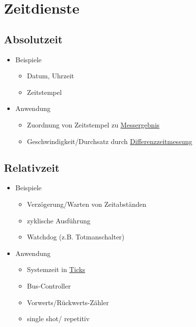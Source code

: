 \section{Zeitdienste}
\subsection{Absolutzeit}
\begin{itemize}
	\item Beispiele
	\begin{itemize}
		\item Datum, Uhrzeit
		\item Zeitstempel
	\end{itemize}
	
	\item Anwendung
	\begin{itemize}
		\item Zuordnung von Zeitstempel zu \underline{Messergebnis}
		\item Geschwindigkeit/Durchsatz durch \underline{Differenzzeitmessung}
	\end{itemize}
\end{itemize}
	
\subsection{Relativzeit}
\begin{itemize}
	\item Beispiele
	\begin{itemize}
		\item Verzögerung/Warten von Zeitabständen
		\item zyklische Ausführung
		\item Watchdog (z.B. Totmanschalter)
	\end{itemize}
	
	\item Anwendung
	\begin{itemize}
		\item Systemzeit in \underline{Ticks}
		\item Bus-Controller
		\item Vorwerts/Rückwerts-Zähler
		\item single shot/ repetitiv
	\end{itemize}
\end{itemize}